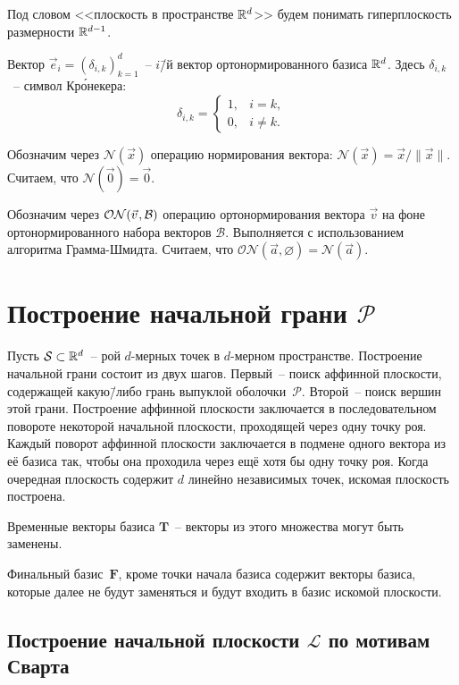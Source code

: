 \documentclass[a4paper,12pt]{article}
\newcommand{\R}[1][]{%
  \ifthenelse{\equal{#1}{}}%
  {\mathbb{R}}%
  {\mathbb{R}^{#1}}}
\newcommand{\Swarm}{\mathcal{S}}              %
\newcommand{\Polytop}{\mathcal{P}}         %
\newcommand{\Basis}{\mathcal{B}}              %
\newcommand{\ZVec}{\vec 0}                    %
\newcommand{\norm}[2][]{#1\lVert #2 #1\rVert}             %
\newcommand{\Norm}[2][]{\mathcal{N}#1( #2 #1)} %
\newcommand{\ONorm}[3][]{\mathcal{ON}#1( #2, #3 #1)} %
\newcommand{\TempVec}{\mathbf{T}}  %
\newcommand{\FinalVec}{\mathbf{F}} %
\newcommand{\Plane}{\mathcal{L}}           %
\renewcommand{\.}{\hspace{0.2ex}}
\begin{document}


  Под словом <<плоскость в пространстве $\R[d]$>> будем понимать гиперплоскость размерности $\R[d-1]$.

  Вектор $\vec e_i = (\delta_{i,k})_{k=1}^d$~-- $i$\=/й вектор ортонормированного базиса $\R[d]$.
  Здесь $\delta_{i,k}$~-- символ Кр\'{о}некера:
  $$
  \delta_{i,k} =
  \begin{cases}
    1, & i=k, \\
    0, & i\neq k.
  \end{cases}
  $$

  Обозначим через $\Norm{\vec x}$ операцию нормирования вектора: $\Norm{\vec x} = \vec x \big / \norm{\vec x}$. Считаем, что $\Norm{\ZVec} = \ZVec$.

  Обозначим через $\ONorm{\vec v \.}{\Basis}$ операцию ортонормирования вектора $\vec v$ на фоне ортонормированного набора векторов $\Basis$. Выполняется с использованием алгоритма Грамма-Шмидта. Считаем, что $\ONorm{\vec a}{\varnothing} = \Norm{\vec a}$.


\section{Построение начальной грани $\Polytop$}
  Пусть $\Swarm \subset \R[d]$~-- рой $d$-мерных точек в $d$-мерном пространстве. Построение начальной грани состоит из двух шагов. Первый~-- поиск аффинной плоскости, содержащей какую\=/либо грань выпуклой оболочки~$\Polytop$. Второй~-- поиск вершин этой грани. Построение аффинной плоскости заключается в последовательном повороте некоторой начальной плоскости, проходящей через одну точку роя. Каждый поворот аффинной плоскости заключается в подмене одного вектора из её базиса так, чтобы она проходила через ещё хотя бы одну точку роя. Когда очередная плоскость содержит $d$ линейно независимых точек, искомая плоскость построена.

  Временные векторы базиса $\TempVec$~-- векторы из этого множества могут быть заменены.

  Финальный базис~$\FinalVec$, кроме точки начала базиса содержит векторы базиса, которые далее не будут заменяться и будут входить в базис искомой плоскости.

  \subsection{Построение начальной плоскости $\Plane$ по мотивам Сварта}
    \label{InitialPlaneSwart}
\end{document}
